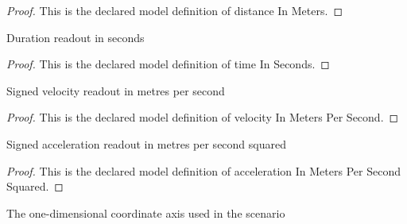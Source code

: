 \begin{proof}
  This is the declared model definition of distance In Meters.
\end{proof}
\begin{definition}
  \label{def:physics:phyx-mini-0670:phyxminiproblems-problemphyxmini0670-timeinseconds}
  Duration readout in seconds
\end{definition}
\begin{proof}
  This is the declared model definition of time In Seconds.
\end{proof}
\begin{definition}
  \label{def:physics:phyx-mini-0670:phyxminiproblems-problemphyxmini0670-velocityinmeterspersecond}
  Signed velocity readout in metres per second
\end{definition}
\begin{proof}
  This is the declared model definition of velocity In Meters Per Second.
\end{proof}
\begin{definition}
  \label{def:physics:phyx-mini-0670:phyxminiproblems-problemphyxmini0670-accelerationinmeterspersecondsquared}
  Signed acceleration readout in metres per second squared
\end{definition}
\begin{proof}
  This is the declared model definition of acceleration In Meters Per Second Squared.
\end{proof}
\begin{definition}
  \label{def:physics:phyx-mini-0670:phyxminiproblems-problemphyxmini0670-spatialaxis}
  The one-dimensional coordinate axis used in the scenario
\end{definition}
